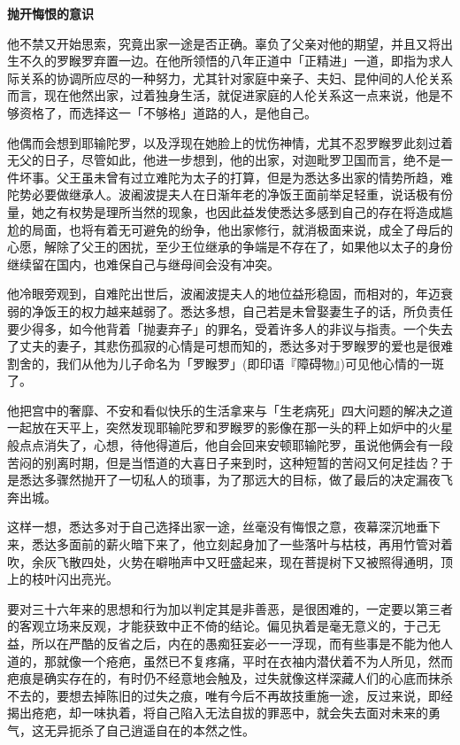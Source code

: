 \documentclass[twoside,openany]{book}
\newcommand{\mt}[1]{\textbullet \textbf{#1}}
\begin{document}
\mt{抛开悔恨的意识}

他不禁又开始思索，究竟出家一途是否正确。辜负了父亲对他的期望，并且又将出生不久的罗睺罗弃置一边。在他所领悟的八年正道中「正精进」一道，即指为求人际关系的协调所应尽的一种努力，尤其针对家庭中亲子、夫妇、昆仲间的人伦关系而言，现在他然出家，过着独身生活，就促进家庭的人伦关系这一点来说，他是不够资格了，而选择这一「不够格」道路的人，是他自己。

他偶而会想到耶输陀罗，以及浮现在她脸上的忧伤神情，尤其不忍罗睺罗此刻过着无父的日子，尽管如此，他进一步想到，他的出家，对迦毗罗卫国而言，绝不是一件坏事。父王虽未曾有过立难陀为太子的打算，但是为悉达多出家的情势所趋，难陀势必要做继承人。波阇波提夫人在日渐年老的净饭王面前举足轻重，说话极有份量，她之有权势是理所当然的现象，也因此益发使悉达多感到自己的存在将造成尴尬的局面，也将有着无可避免的纷争，他出家修行，就消极面来说，成全了母后的心愿，解除了父王的困扰，至少王位继承的争端是不存在了，如果他以太子的身份继续留在国内，也难保自己与继母间会没有冲突。

他冷眼旁观到，自难陀出世后，波阇波提夫人的地位益形稳固，而相对的，年迈衰弱的净饭王的权力越来越弱了。悉达多想，自己若是未曾娶妻生子的话，所负责任要少得多，如今他背着「抛妻弃子」的罪名，受着许多人的非议与指责。一个失去了丈夫的妻子，其悲伤孤寂的心情是可想而知的，悉达多对于罗睺罗的爱也是很难割舍的，我们从他为儿子命名为「罗睺罗」(即印语『障碍物』)可见他心情的一斑了。

他把宫中的奢靡、不安和看似快乐的生活拿来与「生老病死」四大问题的解决之道一起放在天平上，突然发现耶输陀罗和罗睺罗的影像在那一头的秤上如炉中的火星般点点消失了，心想，待他得道后，他自会回来安顿耶输陀罗，虽说他俩会有一段苦闷的别离时期，但是当悟道的大喜日子来到时，这种短暂的苦闷又何足挂齿？于是悉达多骤然抛开了一切私人的琐事，为了那远大的目标，做了最后的决定漏夜飞奔出城。

这样一想，悉达多对于自己选择出家一途，丝毫没有悔恨之意，夜幕深沉地垂下来，悉达多面前的薪火暗下来了，他立刻起身加了一些落叶与枯枝，再用竹管对着吹，余灰飞散四处，火势在噼啪声中又旺盛起来，现在菩提树下又被照得通明，顶上的枝叶闪出亮光。

要对三十六年来的思想和行为加以判定其是非善恶，是很困难的，一定要以第三者的客观立场来反观，才能获致中正不倚的结论。偏见执着是毫无意义的，于己无益，所以在严酷的反省之后，内在的愚痴狂妄必一一浮现，而有些事是不能为他人道的，那就像一个疮疤，虽然已不复疼痛，平时在衣袖内潜伏着不为人所见，然而疤痕是确实存在的，有时仍不经意地会触及，过失就像这样深藏人们的心底而抹杀不去的，要想去掉陈旧的过失之痕，唯有今后不再故技重施一途，反过来说，即经揭出疮疤，却一味执着，将自己陷入无法自拔的罪恶中，就会失去面对未来的勇气，这无异扼杀了自己逍遥自在的本然之性。
\end{document}
